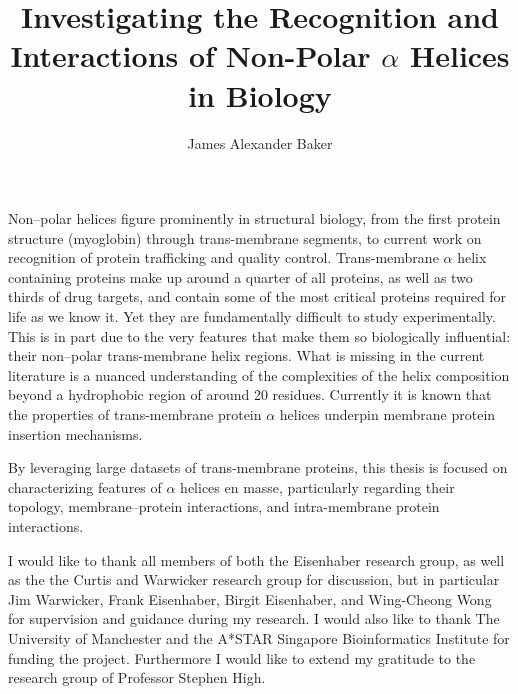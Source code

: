 \documentclass[12pt,PhD,twoside]{muthesis}
\begin{document}
\title{Investigating the Recognition and Interactions of Non-Polar $\alpha$ Helices in Biology}
\author{James Alexander Baker}
\def\wordcount{8496}
\tablespagefalse

\figurespagefalse



\beforeabstract %
Non\---polar helices figure prominently in structural biology, from the first protein structure (myoglobin) through trans-membrane segments, to current work on recognition of protein trafficking and quality control. Trans-membrane $\alpha$ helix containing proteins make up around a quarter of all proteins, as well as two thirds of drug targets, and contain some of the most critical proteins required for life as we know it. Yet they are fundamentally difficult to study experimentally. This is in part due to the very features that make them so biologically influential: their non\---polar trans-membrane helix regions. What is missing in the current literature is a nuanced understanding of the complexities of the helix composition beyond a hydrophobic region of around 20 residues. Currently it is known that the properties of trans-membrane protein $\alpha$ helices underpin membrane protein insertion mechanisms.

By leveraging large datasets of trans-membrane proteins, this thesis is focused on characterizing features of $\alpha$ helices en masse, particularly regarding their topology, membrane\---protein interactions, and intra-membrane protein interactions.

\afterabstract


I would like to thank all members of both the Eisenhaber research group, as well as the the Curtis and Warwicker research group for discussion, but in particular Jim Warwicker, Frank Eisenhaber, Birgit Eisenhaber, and Wing-Cheong Wong for supervision and guidance during my research. I would also like to thank The University of Manchester and the A*STAR Singapore Bioinformatics Institute for funding the project. Furthermore I would like to extend my gratitude to the research group of Professor Stephen High.
\end{document}
